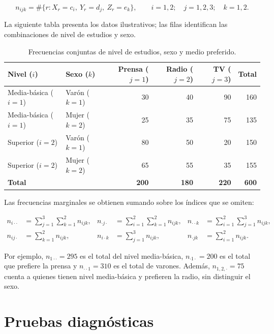 \begin{equation*}
n_{ijk}=\#\{r:X_r=c_i,\ Y_r=d_j,\ Z_r=e_k\},\qquad i=1,2;\quad j=1,2,3;\quad k=1,2.
\end{equation*}

La siguiente tabla presenta los datos ilustrativos; las filas identifican las combinaciones de nivel de estudios y sexo.

\begin{table}[H]
\centering
\small
\setlength{\tabcolsep}{4pt}
\renewcommand{\arraystretch}{1.15}
\begin{tabular}{|l|l|r|r|r|r|}
\hline
\textbf{Nivel ($i$)} & \textbf{Sexo ($k$)} & \textbf{Prensa ($j=1$)} & \textbf{Radio ($j=2$)} & \textbf{TV ($j=3$)} & \textbf{Total} \\ \hline
Media-básica ($i=1$) & Varón ($k=1$) & 30 & 40 & 90 & 160 \\ \hline
Media-básica ($i=1$) & Mujer ($k=2$) & 25 & 35 & 75 & 135 \\ \hline
Superior ($i=2$) & Varón ($k=1$) & 80 & 50 & 20 & 150 \\ \hline
Superior ($i=2$) & Mujer ($k=2$) & 65 & 55 & 35 & 155 \\ \hline
\textbf{Total} & & \textbf{200} & \textbf{180} & \textbf{220} & \textbf{600} \\ \hline
\end{tabular}
\caption{Frecuencias conjuntas de nivel de estudios, sexo y medio preferido.}
\label{tab:frecuencias-tres-variables}
\end{table}

Las frecuencias marginales se obtienen sumando sobre los índices que se omiten:

\begin{align*}
n_{i\cdot\cdot}&=\sum_{j=1}^{3}\sum_{k=1}^{2}n_{ijk}, &
n_{\cdot j\cdot}&=\sum_{i=1}^{2}\sum_{k=1}^{2}n_{ijk}, &
n_{\cdot\cdot k}&=\sum_{i=1}^{2}\sum_{j=1}^{3}n_{ijk},\\
n_{ij\cdot}&=\sum_{k=1}^{2}n_{ijk}, &
n_{i\cdot k}&=\sum_{j=1}^{3}n_{ijk}, &
n_{\cdot jk}&=\sum_{i=1}^{2}n_{ijk}.
\end{align*}

Por ejemplo, $n_{1\cdot\cdot}=295$ es el total del nivel media-básica, $n_{\cdot1\cdot}=200$ es el total que prefiere la prensa y $n_{\cdot\cdot1}=310$ es el total de varones. Además, $n_{1,2,\cdot}=75$ cuenta a quienes tienen nivel media-básica y prefieren la radio, sin distinguir el sexo.

\section{Pruebas diagnósticas}

